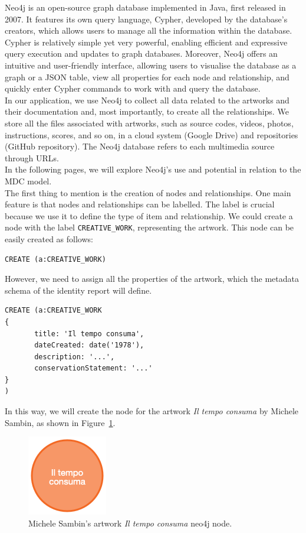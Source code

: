 Neo4j is an open-source graph database implemented in Java, first released in 2007. It features its own query language, Cypher, developed by the database's creators, which allows users to manage all the information within the database. Cypher is relatively simple yet very powerful, enabling efficient and expressive query execution and updates to graph databases. Moreover, Neo4j offers an intuitive and user-friendly interface, allowing users to visualise the database as a graph or a JSON table, view all properties for each node and relationship, and quickly enter Cypher commands to work with and query the database.\\
In our application, we use Neo4j to collect all data related to the artworks and their documentation and, most importantly, to create all the relationships. We store all the files associated with artworks, such as source codes, videos, photos, instructions, scores, and so on, in a cloud system (Google Drive) and repositories (GitHub repository). The Neo4j database refers to each multimedia source through URLs.\\
In the following pages, we will explore Neo4j's use and potential in relation to the MDC model.\\
\newline
The first thing to mention is the creation of nodes and relationships. One main feature is that nodes and relationships can be labelled. The label is crucial because we use it to define the type of item and relationship. We could create a node with the label \texttt{CREATIVE\_WORK}, representing the artwork. This node can be easily created as follows:
\begin{lstlisting}[style=cypher]
CREATE (a:CREATIVE_WORK)
\end{lstlisting}
However, we need to assign all the properties of the artwork, which the metadata schema of the identity report will define.
\begin{lstlisting}[style=cypher]
CREATE (a:CREATIVE_WORK
{
       title: 'Il tempo consuma',
       dateCreated: date('1978'),
       description: '...',
       conservationStatement: '...'
}
)
\end{lstlisting}
In this way, we will create the node for the artwork \textit{Il tempo consuma} by Michele Sambin, as shown in Figure~\ref{fig:c4-neo4j-creativework}.

\begin{figure}[!h]
    \centering
    \includegraphics[width=0.165\linewidth]{chapters/4-MDC_model_application/image/neo4j-singlenode.png}
    \caption{Michele Sambin's artwork \textit{Il tempo consuma} neo4j node.}
    \label{fig:c4-neo4j-creativework}
\end{figure}

